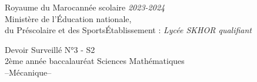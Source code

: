 \documentclass[12pt]{article}
\newcommand\headerMe[2]{\noindent{}#1\hfill#2}
\begin{document}
\headerMe{Royaume du Maroc}{année scolaire \emph{2023-2024}}\\
\headerMe{Ministère de l'Éducation nationale, }{  }\\
\headerMe{du Préscolaire et des Sports}{Établissement : \emph{Lycée SKHOR qualifiant}}\\
\vspace{-1cm}
\begin{center}
	Devoir Surveillé  N°3 - S2 \\

	2ème année baccalauréat Sciences Mathématiques\\
	\hrulefill
  \Large{--Mécanique--}
	\hrulefill\\


	\vspace{.2cm}
\end{center}
\end{document}
